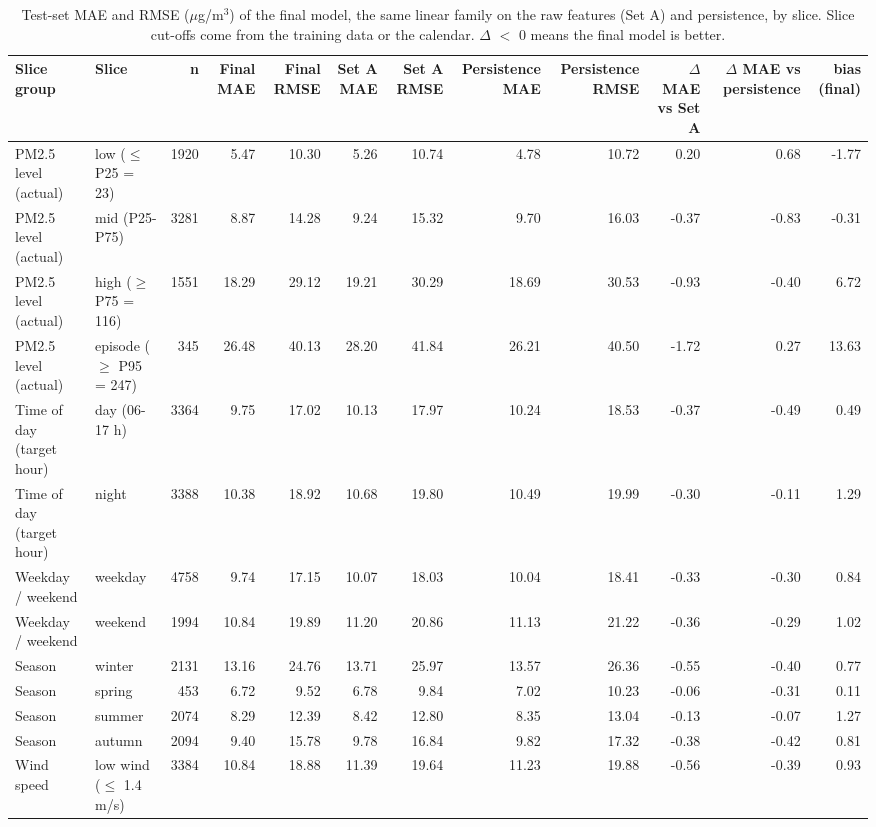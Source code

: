 \begin{table}[t]
\centering
\small
\caption{Test-set MAE and RMSE ($\mu$g/m$^3$) of the final model, the same linear family on the raw features (Set A) and persistence, by slice. Slice cut-offs come from the training data or the calendar. $\Delta$ $<$ 0 means the final model is better.}
\label{tab:table_7_slice_level_performance}
\begin{tabular}{llrrrrrrrrrr}
\toprule
Slice group & Slice & n & Final MAE & Final RMSE & Set A MAE & Set A RMSE & Persistence MAE & Persistence RMSE & $\Delta$ MAE vs Set A & $\Delta$ MAE vs persistence & bias (final) \\
\midrule
PM2.5 level (actual) & low ($\leq$ P25 = 23) & 1920 & 5.47 & 10.30 & 5.26 & 10.74 & 4.78 & 10.72 & 0.20 & 0.68 & -1.77 \\
PM2.5 level (actual) & mid (P25-P75) & 3281 & 8.87 & 14.28 & 9.24 & 15.32 & 9.70 & 16.03 & -0.37 & -0.83 & -0.31 \\
PM2.5 level (actual) & high ($\geq$ P75 = 116) & 1551 & 18.29 & 29.12 & 19.21 & 30.29 & 18.69 & 30.53 & -0.93 & -0.40 & 6.72 \\
PM2.5 level (actual) & episode ($\geq$ P95 = 247) & 345 & 26.48 & 40.13 & 28.20 & 41.84 & 26.21 & 40.50 & -1.72 & 0.27 & 13.63 \\
Time of day (target hour) & day (06-17 h) & 3364 & 9.75 & 17.02 & 10.13 & 17.97 & 10.24 & 18.53 & -0.37 & -0.49 & 0.49 \\
Time of day (target hour) & night & 3388 & 10.38 & 18.92 & 10.68 & 19.80 & 10.49 & 19.99 & -0.30 & -0.11 & 1.29 \\
Weekday / weekend & weekday & 4758 & 9.74 & 17.15 & 10.07 & 18.03 & 10.04 & 18.41 & -0.33 & -0.30 & 0.84 \\
Weekday / weekend & weekend & 1994 & 10.84 & 19.89 & 11.20 & 20.86 & 11.13 & 21.22 & -0.36 & -0.29 & 1.02 \\
Season & winter & 2131 & 13.16 & 24.76 & 13.71 & 25.97 & 13.57 & 26.36 & -0.55 & -0.40 & 0.77 \\
Season & spring & 453 & 6.72 & 9.52 & 6.78 & 9.84 & 7.02 & 10.23 & -0.06 & -0.31 & 0.11 \\
Season & summer & 2074 & 8.29 & 12.39 & 8.42 & 12.80 & 8.35 & 13.04 & -0.13 & -0.07 & 1.27 \\
Season & autumn & 2094 & 9.40 & 15.78 & 9.78 & 16.84 & 9.82 & 17.32 & -0.38 & -0.42 & 0.81 \\
Wind speed & low wind ($\leq$ 1.4 m/s) & 3384 & 10.84 & 18.88 & 11.39 & 19.64 & 11.23 & 19.88 & -0.56 & -0.39 & 0.93 \\

\end{tabular}
\end{table}
